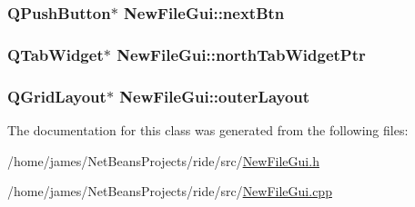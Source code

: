 \hypertarget{class_new_file_gui_ad1fa3cb3fa909bf6e71672497350f980}{
\subsubsection[{next\-Btn}]{\setlength{\rightskip}{0pt plus 5cm}Q\-Push\-Button$\ast$ New\-File\-Gui\-::next\-Btn\hspace{0.3cm}{\ttfamily [private]}}}\label{class_new_file_gui_ad1fa3cb3fa909bf6e71672497350f980}
\hypertarget{class_new_file_gui_a101bfb66cbd62d340e55d632d07d7982}{
\subsubsection[{north\-Tab\-Widget\-Ptr}]{\setlength{\rightskip}{0pt plus 5cm}Q\-Tab\-Widget$\ast$ New\-File\-Gui\-::north\-Tab\-Widget\-Ptr\hspace{0.3cm}{\ttfamily [private]}}}\label{class_new_file_gui_a101bfb66cbd62d340e55d632d07d7982}
\hypertarget{class_new_file_gui_ae5aa1370799c06f4368ef636279ab259}{
\subsubsection[{outer\-Layout}]{\setlength{\rightskip}{0pt plus 5cm}Q\-Grid\-Layout$\ast$ New\-File\-Gui\-::outer\-Layout\hspace{0.3cm}{\ttfamily [private]}}}\label{class_new_file_gui_ae5aa1370799c06f4368ef636279ab259}


The documentation for this class was generated from the following files\-:\begin{DoxyCompactItemize}
\item 
/home/james/\-Net\-Beans\-Projects/ride/src/\hyperlink{_new_file_gui_8h}{New\-File\-Gui.\-h}\item 
/home/james/\-Net\-Beans\-Projects/ride/src/\hyperlink{_new_file_gui_8cpp}{New\-File\-Gui.\-cpp}\end{DoxyCompactItemize}
